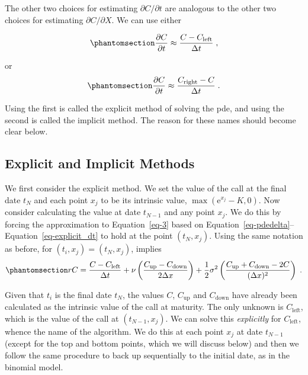 \documentclass[
  letterpaper,
  DIV=11,
  numbers=noendperiod]{scrartcl}
\theoremstyle{definition}
\theoremstyle{remark}
\begin{document}
The other two choices for estimating \(\partial C/\partial t\) are
analogous to the other two choices for estimating
\(\partial C/\partial X\). We can use either

\begin{equation}\phantomsection\label{eq-explicit_dt}{
\frac{\partial C}{\partial t} \approx \frac{C-C_{\text{left}}}{\Delta t}\;,
}\end{equation}

\[
\] or \begin{equation}\phantomsection\label{eq-implicit_dt}{
\frac{\partial C}{\partial t} \approx \frac{C_{\text{right}}-C}{\Delta t}\;. 
}\end{equation}

Using the first is called the explicit method of solving the pde, and
using the second is called the implicit method. The reason for these
names should become clear below.

\subsection{Explicit and Implicit
Methods}\label{explicit-and-implicit-methods}

We first consider the explicit method. We set the
value of the call at the final date \(t_N\) and each point \(x_j\) to be
its intrinsic value, \(\max\left(\mathrm{e}^{x_j}-K,0\right)\). Now
consider calculating the value at date \(t_{N-1}\) and any point
\(x_j\). We do this by forcing the approximation to Equation~\ref{eq-3}
based on Equation~\ref{eq-pdedelta}--Equation~\ref{eq-explicit_dt} to
hold at the point \((t_N,x_j)\). Using the same notation as before, for
\((t_i,x_j)=(t_N,x_j)\), implies
\begin{equation}\phantomsection\label{eq-explicit}{
rC = \frac{C-C_{\text{left}}}{\Delta t}+ \nu\left(\frac{C_{\text{up}}-C_{\text{down}}}{2\Delta x}\right)+ \frac{1}{2}\sigma^2\left(\frac{C_{\text{up}}+C_{\text{down}}-2C}{(\Delta x)^2}\right)\;.
}\end{equation}

Given that \(t_i\) is the final date \(t_N\), the values \(C\),
\(C_{\text{up}}\) and \(C_{\text{down}}\) have already been calculated
as the intrinsic value of the call at maturity. The only unknown is
\(C_{\text{left}}\), which is the value of the call at
\((t_{N-1},x_j)\). We can solve this \emph{explicitly} for
\(C_{\text{left}}\), whence the name of the algorithm. We do this at
each point \(x_j\) at date \(t_{N-1}\) (except for the top and bottom
points, which we will discuss below) and then we follow the same
procedure to back up sequentially to the initial date, as in the
binomial model.
\end{document}
